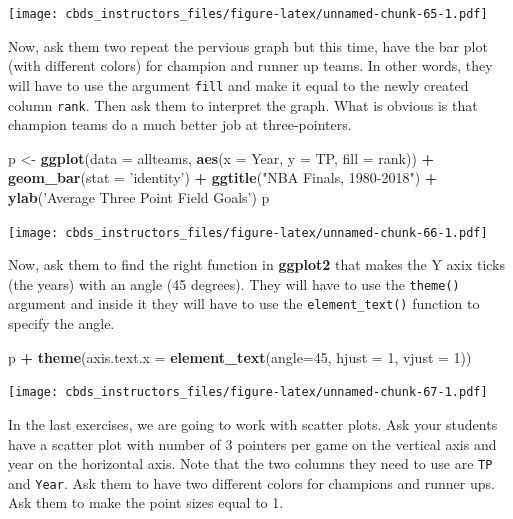\documentclass[]{book}
\newenvironment{Shaded}{\begin{snugshade}}{\end{snugshade}}
\newcommand{\DataTypeTok}[1]{\textcolor[rgb]{0.13,0.29,0.53}{#1}}
\newcommand{\DecValTok}[1]{\textcolor[rgb]{0.00,0.00,0.81}{#1}}
\newcommand{\KeywordTok}[1]{\textcolor[rgb]{0.13,0.29,0.53}{\textbf{#1}}}
\newcommand{\NormalTok}[1]{#1}
\newcommand{\OperatorTok}[1]{\textcolor[rgb]{0.81,0.36,0.00}{\textbf{#1}}}
\newcommand{\StringTok}[1]{\textcolor[rgb]{0.31,0.60,0.02}{#1}}
\begin{document}
\texttt{[image: cbds\_instructors\_files/figure-latex/unnamed-chunk-65-1.pdf]}

Now, ask them two repeat the pervious graph but this time, have the bar plot (with different colors) for champion and runner up teams. In other words, they will have to use the argument \texttt{fill} and make it equal to the newly created column \texttt{rank}. Then ask them to interpret the graph. What is obvious is that champion teams do a much better job at three-pointers.

\begin{Shaded}
\begin{Highlighting}[]
\NormalTok{p <-}\StringTok{ }\KeywordTok{ggplot}\NormalTok{(}\DataTypeTok{data =}\NormalTok{ allteams, }\KeywordTok{aes}\NormalTok{(}\DataTypeTok{x =}\NormalTok{ Year, }\DataTypeTok{y =}\NormalTok{ TP, }\DataTypeTok{fill =}\NormalTok{ rank)) }\OperatorTok{+}\StringTok{ }
\StringTok{    }\KeywordTok{geom_bar}\NormalTok{(}\DataTypeTok{stat =} \StringTok{'identity'}\NormalTok{) }\OperatorTok{+}
\StringTok{    }\KeywordTok{ggtitle}\NormalTok{(}\StringTok{"NBA Finals, 1980-2018"}\NormalTok{) }\OperatorTok{+}
\StringTok{    }\KeywordTok{ylab}\NormalTok{(}\StringTok{'Average Three Point Field Goals'}\NormalTok{)}
\NormalTok{p}
\end{Highlighting}
\end{Shaded}

\texttt{[image: cbds\_instructors\_files/figure-latex/unnamed-chunk-66-1.pdf]}

Now, ask them to find the right function in \textbf{ggplot2} that makes the Y axix ticks (the years) with an angle (45 degrees). They will have to use the \texttt{theme()} argument and inside it they will have to use the \texttt{element\_text()} function to specify the angle.

\begin{Shaded}
\begin{Highlighting}[]
\NormalTok{p }\OperatorTok{+}\StringTok{ }\KeywordTok{theme}\NormalTok{(}\DataTypeTok{axis.text.x =} \KeywordTok{element_text}\NormalTok{(}\DataTypeTok{angle=}\DecValTok{45}\NormalTok{, }\DataTypeTok{hjust =} \DecValTok{1}\NormalTok{, }\DataTypeTok{vjust =} \DecValTok{1}\NormalTok{))}
\end{Highlighting}
\end{Shaded}

\texttt{[image: cbds\_instructors\_files/figure-latex/unnamed-chunk-67-1.pdf]}

In the last exercises, we are going to work with scatter plots. Ask your students have a scatter plot with number of 3 pointers per game on the vertical axis and year on the horizontal axis. Note that the two columns they need to use are \texttt{TP} and \texttt{Year}. Ask them to have two different colors for champions and runner ups. Ask them to make the point sizes equal to 1.
\end{document}
